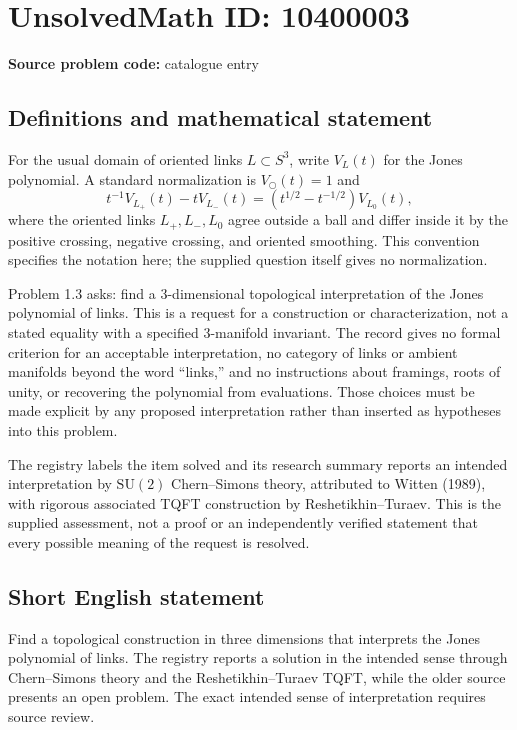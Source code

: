 \documentclass[11pt]{article}
\begin{document}
\section*{UnsolvedMath ID: 10400003}
\textbf{Source problem code:} catalogue entry
\subsection{Definitions and mathematical statement}
For the usual domain of oriented links \(L\subset S^3\), write \(V_L(t)\) for the Jones polynomial. A standard normalization is \(V_{\bigcirc}(t)=1\) and
\[
 t^{-1}V_{L_+}(t)-tV_{L_-}(t)
   =(t^{1/2}-t^{-1/2})V_{L_0}(t),
\]
where the oriented links \(L_+,L_-,L_0\) agree outside a ball and differ inside it by the positive crossing, negative crossing, and oriented smoothing. This convention specifies the notation here; the supplied question itself gives no normalization.

Problem 1.3 asks: find a \(3\)-dimensional topological interpretation of the Jones polynomial of links. This is a request for a construction or characterization, not a stated equality with a specified \(3\)-manifold invariant. The record gives no formal criterion for an acceptable interpretation, no category of links or ambient manifolds beyond the word ``links,'' and no instructions about framings, roots of unity, or recovering the polynomial from evaluations. Those choices must be made explicit by any proposed interpretation rather than inserted as hypotheses into this problem.

The registry labels the item solved and its research summary reports an intended interpretation by \(\mathrm{SU}(2)\) Chern--Simons theory, attributed to Witten (1989), with rigorous associated TQFT construction by Reshetikhin--Turaev. This is the supplied assessment, not a proof or an independently verified statement that every possible meaning of the request is resolved.
\subsection{Short English statement}
Find a topological construction in three dimensions that interprets the Jones polynomial of links. The registry reports a solution in the intended sense through Chern--Simons theory and the Reshetikhin--Turaev TQFT, while the older source presents an open problem. The exact intended sense of interpretation requires source review.
\end{document}
